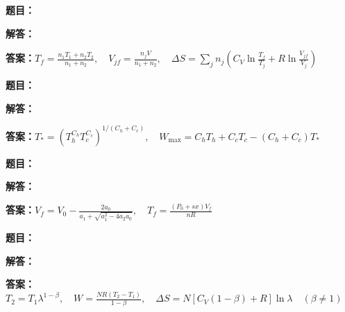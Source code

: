 \documentclass[lang=cn,color=blue,11pt]{elegantbook}
\begin{document}
\par
\noindent\textbf{题目：}
\par\noindent\textbf{解答：}
\par\noindent\textbf{答案：}\(\displaystyle T_f=\frac{n_1T_1+n_2T_2}{n_1+n_2},\quad V_{jf}=\frac{n_jV}{n_1+n_2},\quad\Delta S=\sum_jn_j\!\left(C_V\ln\frac{T_f}{T_j}+R\ln\frac{V_{jf}}{V_j}\right)\)\par
\par\smallskip\noindent\hrulefill\par\medskip
{}\par
\noindent\textbf{题目：}
\par\noindent\textbf{解答：}
\par\noindent\textbf{答案：}\(\displaystyle T_*=(T_h^{C_h}T_c^{C_c})^{1/(C_h+C_c)},\quad W_{\max}=C_hT_h+C_cT_c-(C_h+C_c)T_*\)\par
\par\smallskip\noindent\hrulefill\par\medskip
{}\par
\noindent\textbf{题目：}
\par\noindent\textbf{解答：}
\par\noindent\textbf{答案：}\(\displaystyle V_f=V_0-\frac{2a_0}{a_1+\sqrt{a_1^2-4a_2a_0}},\quad T_f=\frac{(P_0+sx)V_f}{nR}\)\par
\par\smallskip\noindent\hrulefill\par\medskip
{}\par
\noindent\textbf{题目：}
\par\noindent\textbf{解答：}
\par\noindent\textbf{答案：}\(\displaystyle T_2=T_1\lambda^{1-\beta},\quad W=\frac{NR(T_2-T_1)}{1-\beta},\quad \Delta S=N[C_V(1-\beta)+R]\ln\lambda\quad(\beta\ne1)\)\par
\par\smallskip\noindent\hrulefill\par\medskip
\end{document}
